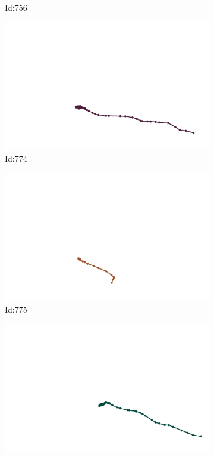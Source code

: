 \documentclass[12pt,twoside]{report}
\begin{document}
\begin{figure}
\begin{subfigure}[b]{0.20\textwidth}
\caption{Id:756}
\end{subfigure}
\begin{subfigure}[b]{0.20\textwidth}
\centering
\includegraphics[width=\textwidth]{../trajectories/774.png}
\caption{Id:774}
\end{subfigure}
\begin{subfigure}[b]{0.20\textwidth}
\centering
\includegraphics[width=\textwidth]{../trajectories/775.png}
\caption{Id:775}
\end{subfigure}
\begin{subfigure}[b]{0.20\textwidth}
\centering
\includegraphics[width=\textwidth]{../trajectories/790.png}

\end{subfigure}
\end{figure}
\end{document}
